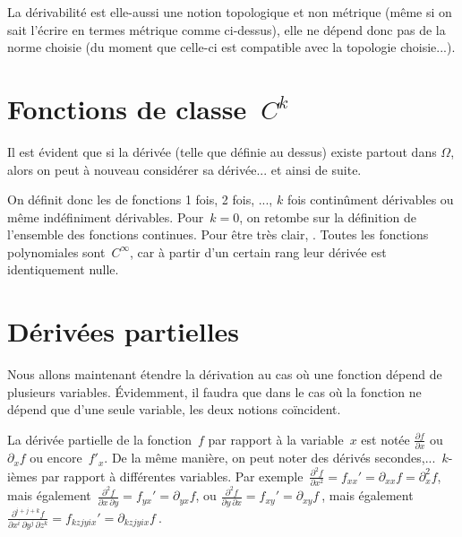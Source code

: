\medskip
La dérivabilité est elle-aussi une notion topologique et non métrique (même si on sait l'écrire en termes métrique comme ci-dessus), elle ne dépend donc pas de la norme choisie (du moment que celle-ci est compatible avec la topologie choisie...).


\medskip
\section{Fonctions de classe~$C^k$}
\medskipvm
Il est évident que si la dérivée (telle que définie au dessus) existe partout dans $\Omega$, alors on peut à nouveau considérer sa dérivée... et ainsi de suite.

On définit donc les  de fonctions 1 fois, 2 fois, ..., $k$ fois continûment dérivables ou même indéfiniment dérivables.
\medskipvm
Pour~$k=0$, on retombe sur la définition de l'ensemble des fonctions continues.
\medskipvm
Pour être très clair, .
\medskipvm
Toutes les fonctions polynomiales sont~$C^\infty$, car à partir d'un certain rang leur dérivée est identiquement nulle.

\medskip
\section{Dérivées partielles}
Nous allons maintenant étendre la dérivation au cas où une fonction dépend de plusieurs variables. Évidemment, il faudra que dans le cas où la fonction ne dépend que d'une seule variable, les deux notions coïncident.

\medskip
{}
\medskipvm
La dérivée partielle de la fonction~$f$ par rapport à la variable~$x$ est notée $\frac{ \partial f}{ \partial x}$ ou~$\partial_x f$ ou encore~$f'_x$.
\medskipvm
De la même manière, on peut noter des dérivés secondes,...~$k$-ièmes par rapport à différentes variables.
Par exemple~$\frac{ \partial^2 f}{ \partial x^2} = f_{xx}' = \partial_{xx} f = \partial^2_x f$, mais également~$\frac{ \partial^2 f}{\partial x\,\partial y} = f_{yx}' = \partial_{yx} f$, ou $\frac{ \partial^2 f}{\partial y\,\partial x} = f_{xy}' = \partial_{xy} f~$, mais également $\frac{ \partial^{i+j+k} f}{ \partial x^i\, \partial y^j\, \partial z^k} = f_{kz jy ix}' = \partial_{kz jy ix} f~$.

